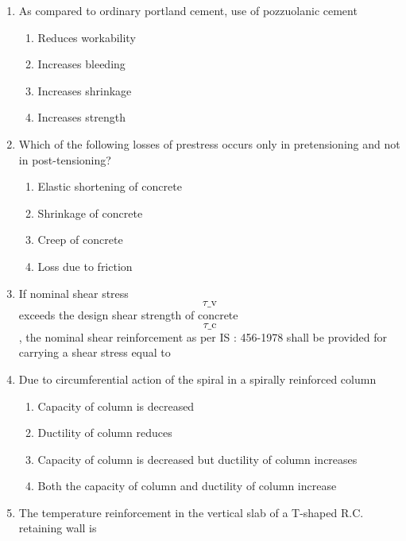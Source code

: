 \documentclass[11pt,a4paper]{article}
\begin{document}
\begin{enumerate}
\begin{enumerate}[label=\Alph*.]
\end{enumerate}
\item{As compared to ordinary portland cement, use of pozzuolanic cement}
\begin{enumerate}[label=\Alph*.]
\item{Reduces workability}
\item{Increases bleeding}
\item{Increases shrinkage}
\item{Increases strength}
\end{enumerate}
\item{Which of the following losses of prestress occurs only in pretensioning and not in post-tensioning?}
\begin{enumerate}[label=\Alph*.]
\item{Elastic shortening of concrete}
\item{Shrinkage of concrete}
\item{Creep of concrete}
\item{Loss due to friction}
\end{enumerate}
\item{If nominal shear stress $${\tau \_{\text{v}}}$$ exceeds the design shear strength of concrete $${\tau \_{\text{c}}}$$, the nominal shear reinforcement as per IS : 456-1978 shall be provided for carrying a shear stress equal to}
\\
\item{Due to circumferential action of the spiral in a spirally reinforced column}
\begin{enumerate}[label=\Alph*.]
\item{Capacity of column is decreased}
\item{Ductility of column reduces}
\item{Capacity of column is decreased but ductility of column increases}
\item{Both the capacity of column and ductility of column increase}
\end{enumerate}
\item{The temperature reinforcement in the vertical slab of a T-shaped R.C. retaining wall is}

\end{enumerate}
\end{document}
